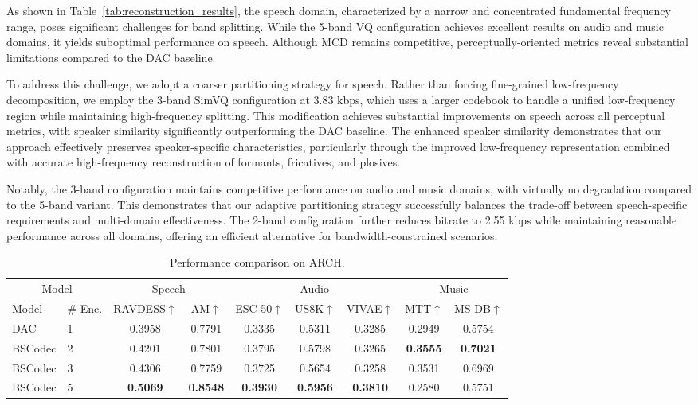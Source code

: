 \documentclass[11pt]{article}
\begin{document}
As shown in Table~\ref{tab:reconstruction_results}, the speech domain, characterized by a narrow and concentrated fundamental frequency range, poses significant challenges for band splitting. While the 5-band VQ configuration achieves excellent results on audio and music domains, it yields suboptimal performance on speech. Although MCD remains competitive, perceptually-oriented metrics reveal substantial limitations compared to the DAC baseline.


To address this challenge, we adopt a coarser partitioning strategy for speech. Rather than forcing fine-grained low-frequency decomposition, we employ the 3-band SimVQ configuration at 3.83 kbps, which uses a larger codebook to handle a unified low-frequency region while maintaining high-frequency splitting. This modification achieves substantial improvements on speech across all perceptual metrics, with speaker similarity significantly outperforming the DAC baseline. The enhanced speaker similarity demonstrates that our approach effectively preserves speaker-specific characteristics, particularly through the improved low-frequency representation combined with accurate high-frequency reconstruction of formants, fricatives, and plosives.

Notably, the 3-band configuration maintains competitive performance on audio and music domains, with virtually no degradation compared to the 5-band variant. This demonstrates that our adaptive partitioning strategy successfully balances the trade-off between speech-specific requirements and multi-domain effectiveness. The 2-band configuration further reduces bitrate to 2.55 kbps while maintaining reasonable performance across all domains, offering an efficient alternative for bandwidth-constrained scenarios.

\begin{table}[t]
\centering
\small
\setlength{\tabcolsep}{4pt}
\renewcommand{\arraystretch}{0.95}
\caption{Performance comparison on ARCH.}
\vspace{-10pt}
\label{tab:classification_results_2}
\begin{tabular}{llccccccc}
\toprule
\multicolumn{2}{c}{Model} & \multicolumn{2}{c}{Speech} & \multicolumn{3}{c}{Audio} & \multicolumn{2}{c}{Music} \\
\cmidrule(lr){1-2} \cmidrule(lr){3-4} \cmidrule(lr){5-7} \cmidrule(lr){8-9}
Model & \# Enc. & RAVDESS$\uparrow$ & AM$\uparrow$ & ESC-50$\uparrow$ & US8K$\uparrow$ & VIVAE$\uparrow$ & MTT$\uparrow$ & MS-DB$\uparrow$ 
\\
\midrule
DAC & 1 & 0.3958 & 0.7791 & 0.3335 & 0.5311 & 0.3285 & 0.2949 & 0.5754 \\
BSCodec & 2 & 0.4201 & 0.7801 & 0.3795 & 0.5798 & 0.3265 & \textbf{0.3555} & \textbf{0.7021} 
\\
BSCodec & 3 & 0.4306 & 0.7759 & 0.3725 & 0.5654 & 0.3258 & 0.3531 & 0.6969 
\\
BSCodec & 5 & \textbf{0.5069} & \textbf{0.8548} & \textbf{0.3930} & \textbf{0.5956} & \textbf{0.3810} & 0.2580 & 0.5751
\\
\bottomrule
\end{tabular}
\vspace{-10pt}
\end{table}
\end{document}
